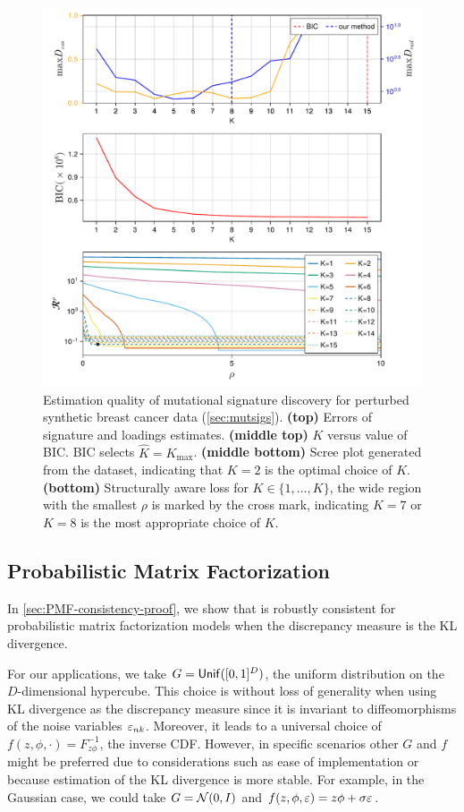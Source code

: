 \begin{figure}[h!]
	\centering
	\includegraphics[width=.8\textwidth]{figures/composite-multdiv-600-breast-custom-seed-1-perturbed-0.0025.pdf}
	\caption{
	Estimation quality of mutational signature discovery for
	perturbed synthetic breast cancer data (\cref{sec:mutsigs}).
	\textbf{(top)} Errors of signature and loadings estimates.
	\textbf{(middle top)} $K$ versus value of BIC. BIC selects $\widehat K=K_{\max}$.
	\textbf{(middle bottom)} Scree plot generated from the dataset, indicating that $K = 2$ is the optimal choice of $K$.
	\textbf{(bottom)} Structurally aware loss for $K\in \{1,\dots,K\}$, the wide region with the smallest $\rho$ is marked by the cross mark, indicating $K=7$ or $K=8$ is the most appropriate choice of $K$.
	}
	\label{fig:mutsig_result}
\end{figure}

\subsection{Probabilistic Matrix Factorization} \label{sec:pmf-applications}

In \cref{sec:PMF-consistency-proof}, we show that \methodname is robustly consistent for probabilistic matrix factorization models 
when the discrepancy measure is the KL divergence.

For our applications, we take $G = {\sf{Unif}}([0,1]^{D})$, the uniform distribution on the $D$-dimensional hypercube.
This choice is without loss of generality when using KL divergence as the discrepancy measure since it is invariant to diffeomorphisms of the noise variables ${\varepsilon}_{nk}$.
Moreover, it leads to a universal choice of $f(z, \phi, \cdot) = F^{-1}_{z\phi}$, the inverse CDF.
However, in specific scenarios other $G$ and $f$ might be preferred due to considerations such as ease of implementation or because
estimation of the KL divergence is more stable.
For example, in the Gaussian case, we could take $G = \mathcal{N}({0}, I)$ and $f(z, \phi, \varepsilon) = z\phi + \sigma \varepsilon$. 

